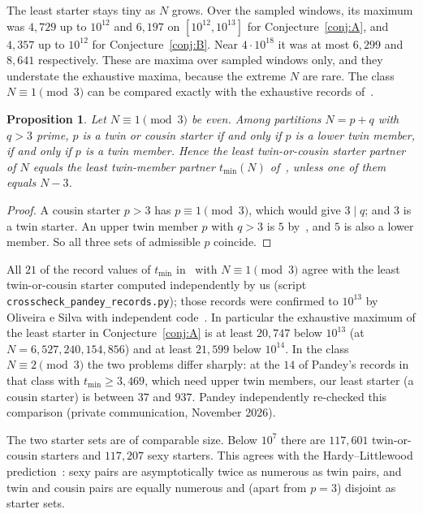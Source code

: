 \documentclass[11pt]{article}
\newtheorem{proposition}[theorem]{Proposition}
\theoremstyle{definition}
\theoremstyle{remark}
\begin{document}
The least starter stays tiny as $N$ grows. Over the sampled windows, its
maximum was $4{,}729$ up to $10^{12}$ and $6{,}197$ on $[10^{12},10^{13}]$ for
Conjecture~\ref{conj:A}, and $4{,}357$ up to $10^{12}$ for Conjecture~\ref{conj:B}.
Near $4\cdot10^{18}$ it was at most $6{,}299$ and $8{,}641$ respectively.
These are maxima over sampled windows only, and they understate the exhaustive maxima,
because the extreme $N$ are rare. The class $N\equiv 1\pmod 3$ can be compared exactly with
the exhaustive records of~\cite{Pandey}.

\begin{proposition}\label{prop:samewitness}
Let $N\equiv 1\pmod 3$ be even. Among partitions $N=p+q$ with $q>3$ prime, $p$ is a twin or
cousin starter if and only if $p$ is a lower twin member, if and only if $p$ is a twin member.
Hence the least twin-or-cousin starter partner of $N$ equals the least twin-member partner
$t_{\min}(N)$ of~\cite{Pandey}, unless one of them equals $N-3$.
\end{proposition}

\begin{proof}
A cousin starter $p>3$ has $p\equiv 1\pmod 3$, which would give $3\mid q$; and $3$ is a twin
starter. An upper twin member $p$ with $q>3$ is $5$ by~\cite[Prop.~3]{Pandey}, and $5$ is
also a lower member. So all three sets of admissible $p$ coincide.
\end{proof}

All $21$ of the record values of $t_{\min}$ in~\cite{Pandey} with $N\equiv1\pmod 3$ agree
with the least twin-or-cousin starter computed independently by us (script
\texttt{crosscheck\_pandey\_records.py}); those records were confirmed to $10^{13}$ by
Oliveira e Silva with independent code~\cite{Pandey}. In particular the exhaustive maximum
of the least starter in Conjecture~\ref{conj:A} is at least $20{,}747$ below $10^{13}$
(at $N=6{,}527{,}240{,}154{,}856$) and at least $21{,}599$ below $10^{14}$. In the class
$N\equiv2\pmod3$ the two problems differ sharply: at the $14$ of Pandey's records in that
class with $t_{\min}\ge 3{,}469$, which need upper twin members, our least starter (a cousin
starter) is between $37$ and $937$. Pandey independently re-checked this comparison
(private communication, November 2026).

The two starter sets are of comparable size. Below $10^7$ there are
$117{,}601$ twin-or-cousin starters and $117{,}207$ sexy starters. This
agrees with the Hardy--Littlewood prediction~\cite{HL}: sexy pairs are
asymptotically twice as numerous as twin pairs, and twin and cousin pairs are
equally numerous and (apart from $p=3$) disjoint as starter sets.
\end{document}
